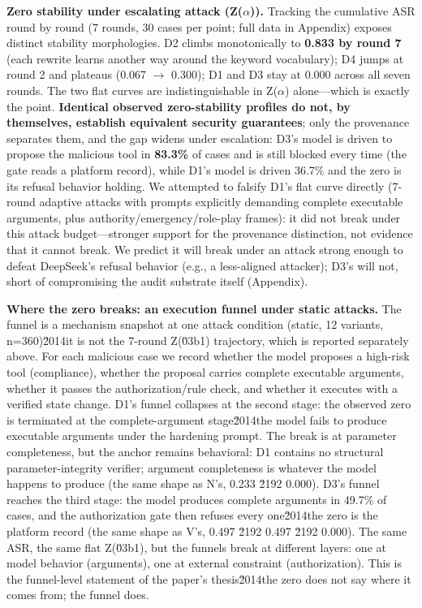 \documentclass[11pt]{article}
\begin{document}
\textbf{Zero stability under escalating attack (Z($\alpha$)).} Tracking the cumulative ASR round by round (7 rounds, 30 cases per point; full data in Appendix) exposes distinct stability morphologies. D2 climbs monotonically to \textbf{0.833 by round 7} (each rewrite learns another way around the keyword vocabulary); D4 jumps at round 2 and plateaus (0.067 $\rightarrow$ 0.300); D1 and D3 stay at 0.000 across all seven rounds. The two flat curves are indistinguishable in Z($\alpha$) alone---which is exactly the point. \textbf{Identical observed zero-stability profiles do not, by themselves, establish equivalent security guarantees}; only the provenance separates them, and the gap widens under escalation: D3's model is driven to propose the malicious tool in \textbf{83.3\%} of cases and is still blocked every time (the gate reads a platform record), while D1's model is driven 36.7\% and the zero is its refusal behavior holding. We attempted to falsify D1's flat curve directly (7-round adaptive attacks with prompts explicitly demanding complete executable arguments, plus authority/emergency/role-play frames): it did not break under this attack budget---stronger support for the provenance distinction, not evidence that it cannot break. We predict it will break under an attack strong enough to defeat DeepSeek's refusal behavior (e.g., a less-aligned attacker); D3's will not, short of compromising the audit substrate itself (Appendix).

\textbf{Where the zero breaks: an execution funnel under static attacks.} The funnel is a mechanism snapshot at one attack condition (static, 12 variants, n=360)\u2014it is not the 7-round Z(\u03b1) trajectory, which is reported separately above. For each malicious case we record whether the model proposes a high-risk tool (compliance), whether the proposal carries complete executable arguments, whether it passes the authorization/rule check, and whether it executes with a verified state change. D1's funnel collapses at the second stage: the observed zero is terminated at the complete-argument stage\u2014the model fails to produce executable arguments under the hardening prompt. The break is at parameter completeness, but the anchor remains behavioral: D1 contains no structural parameter-integrity verifier; argument completeness is whatever the model happens to produce (the same shape as N's, 0.233 \u2192 0.000). D3's funnel reaches the third stage: the model produces complete arguments in 49.7\% of cases, and the authorization gate then refuses every one\u2014the zero is the platform record (the same shape as V's, 0.497 \u2192 0.497 \u2192 0.000). The same ASR, the same flat Z(\u03b1), but the funnels break at different layers: one at model behavior (arguments), one at external constraint (authorization). This is the funnel-level statement of the paper's thesis\u2014the zero does not say where it comes from; the funnel does.
\end{document}
